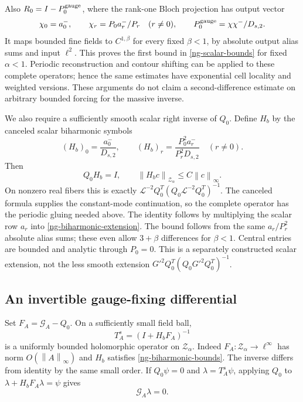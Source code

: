 \documentclass[11pt]{article}
\theoremstyle{remark}
\newcommand{\norm}[1]{\left\|#1\right\|}
\begin{document}
Also $R_0=I-P_0^{\rm gauge}$, where the rank-one Bloch projection
has output vector
\[
 \chi_0=a_0^-,\qquad \chi_r=P_0a_r^-/P_r\quad(r\ne0),
 \qquad P_0^{\rm gauge}=\chi\chi^-/D_{s,2}.
\]
It maps bounded fine fields to $C^{1,\beta}$ for every fixed
$\beta<1$, by absolute output alias sums and input $\ell^2$.
This proves the first bound in \eqref{ng-scalar-bounds} for fixed
$\alpha<1$. Periodic reconstruction and contour shifting can
be applied to these complete operators; hence the same estimates
have exponential cell locality and weighted versions. These
arguments do not claim a second-difference estimate on arbitrary
bounded forcing for the massive inverse.

We also require a sufficiently smooth scalar right inverse of
$Q_0$. Define $H_b$ by the canceled scalar biharmonic symbols
\begin{equation}\label{ng-biharmonic-extension}
 (H_b)_0=\frac{a_0^-}{D_{s,2}},\qquad
 (H_b)_r=\frac{P_0^2a_r^-}{P_r^2D_{s,2}}\quad(r\ne0).
\end{equation}
Then
\begin{equation}\label{ng-biharmonic-bounds}
 Q_0H_b=I,\qquad
 \norm{H_bc}_{\mathcal Z_\alpha}\le C\norm{c}_\infty.
\end{equation}
On nonzero real fibers this is exactly
$\mathcal L^{-2}Q_0^T(Q_0\mathcal L^{-2}Q_0^T)^{-1}$.
The canceled formula supplies the constant-mode continuation, so
the complete operator has the periodic gluing needed above.
The identity follows by multiplying the scalar row $a_r$ into
\eqref{ng-biharmonic-extension}. The bound follows from the
same $a_r/P_r^2$ absolute alias sums; these even allow $3+\beta$
differences for $\beta<1$. Central entries are bounded and analytic
through $P_0=0$. This is a separately constructed scalar extension,
not the less smooth extension $G'^2Q_0^T(Q_0G'^2Q_0^T)^{-1}$.

\subsection{An invertible gauge-fixing differential}

Set $F_A=\mathcal G_A-Q_0$. On a sufficiently small field ball,
\begin{equation}\label{ng-scalar-chart}
 T_A^s=(I+H_bF_A)^{-1}
\end{equation}
is a uniformly bounded holomorphic operator on $\mathcal Z_\alpha$.
Indeed $F_A:\mathcal Z_\alpha\to\ell^\infty$ has norm
$O(\norm{A}_\infty)$ and $H_b$ satisfies
\eqref{ng-biharmonic-bounds}. The inverse differs from identity
by the same small order. If $Q_0\psi=0$ and
$\lambda=T_A^s\psi$, applying $Q_0$ to
$\lambda+H_bF_A\lambda=\psi$ gives
\begin{equation}\label{ng-scalar-kernel}
 \mathcal G_A\lambda=0.
\end{equation}
\end{document}
